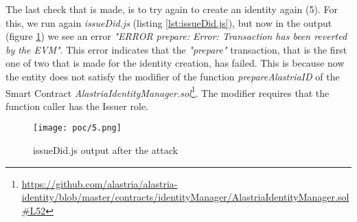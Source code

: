 The last check that is made, is to try again to create an identity again (5). For this, we run again \textit{issueDid.js} (listing \ref{lst:issueDid.js}), but now in the output (figure \ref{fig:poc-5}) we see an error \textit{"ERROR prepare: Error: Transaction has been reverted by the EVM"}. This error indicates that the \textit{"prepare"} transaction, that is the first one of two that is made for the identity creation, has failed. This is because now the entity does not satisfy the modifier of the function \textit{prepareAlastriaID} of the Smart Contract \textit{AlastriaIdentityManager.sol}\footnote{\url{https://github.com/alastria/alastria-identity/blob/master/contracts/identityManager/AlastriaIdentityManager.sol\#L52}}. The modifier requires that the function caller has the Issuer role.
\begin{figure}[h]
    \centering
    \texttt{[image: poc/5.png]}
    \caption{issueDid.js output after the attack}
    \label{fig:poc-5}
\end{figure}
